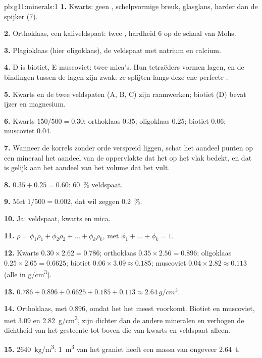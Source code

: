 \begin{solution}{pb:g11:minerals:1}
\textbf{1.} Kwarts: geen , schelpvormige breuk, glasglans, harder
dan de spijker (7).

\textbf{2.} Orthoklaas, een kaliveldspaat: twee , hardheid 6 op
de schaal van Mohs.

\textbf{3.} Plagioklaas (hier oligoklaas), de veldspaat met natrium en
calcium.

\textbf{4.} D is biotiet, E muscoviet: twee mica's. Hun tetraëders vormen
lagen, en de bindingen tussen de lagen zijn zwak: ze splijten langs deze ene
perfecte .

\textbf{5.} Kwarts en de twee veldspaten (A, B, C) zijn raamwerken; biotiet
(D) bevat ijzer en magnesium.

\textbf{6.} Kwarts $150/500 = 0.30$; orthoklaas $0.35$; oligoklaas $0.25$;
biotiet $0.06$; muscoviet $0.04$.

\textbf{7.} Wanneer de korrels zonder orde verspreid liggen, schat het aandeel punten
op een mineraal het aandeel van de oppervlakte dat het op het vlak bedekt, en dat
is gelijk aan het aandeel van het volume dat het vult.

\textbf{8.} $0.35 + 0.25 = 0.60$: \qty{60}{\percent} veldspaat.

\textbf{9.} Met $1/500 = 0.002$, dat wil zeggen \qty{0.2}{\percent}.

\textbf{10.} Ja: veldspaat, kwarts en mica.

\textbf{11.} $\rho = \phi_1 \rho_1 + \phi_2 \rho_2 + \dots + \phi_k \rho_k$,
met $\phi_1 + \dots + \phi_k = 1$.

\textbf{12.} Kwarts $0.30 \times 2.62 = 0.786$; orthoklaas $0.35 \times 2.56 =
0.896$; oligoklaas $0.25 \times 2.65 = 0.6625$; biotiet $0.06 \times 3.09
\approx 0.185$; muscoviet $0.04 \times 2.82 \approx 0.113$ (alle in
\unit{g/cm^3}).

\textbf{13.} $0.786 + 0.896 + 0.6625 + 0.185 + 0.113 \approx
\qty{2.64}{g/cm^3}$.

\textbf{14.} Orthoklaas, met $0.896$, omdat het het meest voorkomt. Biotiet
en muscoviet, met \qty{3.09}{} en \qty{2.82}{g/cm^3}, zijn dichter dan de
andere mineralen en verhogen de dichtheid van het gesteente tot boven die van kwarts en
veldspaat alleen.

\textbf{15.} \qty{2640}{kg/m^3}: \qty{1}{m^3} van het graniet heeft een massa van
ongeveer \qty{2.64}{t}.


\end{solution}
